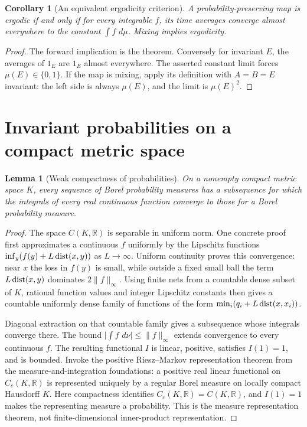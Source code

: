 \documentclass[11pt,oneside]{book}
\newtheorem{lemma}[theorem]{Lemma}
\newtheorem{corollary}[theorem]{Corollary}
\theoremstyle{definition}
\theoremstyle{remark}\newtheorem{remark}[theorem]{Remark}
\newcommand{\R}{\mathbb R}\newcommand{\C}{\mathbb C}
\newcommand{\dd}{\,d}\newcommand{\id}{\operatorname{id}}
\newcommand{\abs}[1]{\lvert#1\rvert}\newcommand{\norm}[1]{\lVert#1\rVert}
\begin{document}
\begin{corollary}[An equivalent ergodicity criterion]\label{d13:19:ergodic-criterion}
A probability-preserving map is ergodic if and only if for every
integrable \(f\), its time averages converge almost everywhere to
the constant \(\int f\,\dd\mu\). Mixing implies ergodicity.
\end{corollary}
\begin{proof}
The forward implication is the theorem. Conversely for invariant
\(E\), the averages of \(1_E\) are \(1_E\) almost everywhere.
The asserted constant limit forces \(\mu(E)\in\{0,1\}\).
If the map is mixing, apply its definition with \(A=B=E\) invariant:
the left side is always \(\mu(E)\), and the limit is \(\mu(E)^2\).
\end{proof}

\section{Invariant probabilities on a compact metric space}

\begin{lemma}[Weak compactness of probabilities]\label{d13:19:probability-compactness}
On a nonempty compact metric space \(K\), every sequence of Borel
probability measures has a subsequence for which the integrals of
every real continuous function converge to those for a Borel
probability measure.
\end{lemma}
\begin{proof}
The space \(C(K,\R)\) is separable in uniform norm. One concrete
proof first approximates a continuous \(f\) uniformly by the
Lipschitz functions
\(\inf_y(f(y)+L\operatorname{dist}(x,y))\) as \(L\to\infty\).
Uniform continuity proves this convergence: near \(x\) the loss
in \(f(y)\) is small, while outside a fixed small ball the term
\(L\operatorname{dist}(x,y)\) dominates \(2\norm{f}_\infty\).
Using finite nets from a countable dense subset of \(K\), rational
function values and integer Lipschitz constants then gives a
countable uniformly dense family of functions of the form
\(\min_i(q_i+L\operatorname{dist}(x,x_i))\).

Diagonal extraction on that countable family gives a subsequence
whose integrals converge there. The bound
\(\abs{\int f\,\dd\nu}\leq\norm{f}_\infty\) extends convergence to
every continuous \(f\). The resulting functional \(I\) is linear,
positive, satisfies \(I(1)=1\), and is bounded.
Invoke the positive Riesz--Markov representation theorem from the
measure-and-integration foundations: a positive real linear
functional on \(C_c(K,\R)\) is represented uniquely by a regular
Borel measure on locally compact Hausdorff \(K\).
Here compactness identifies \(C_c(K,\R)=C(K,\R)\), and \(I(1)=1\)
makes the representing measure a probability. This is the
measure representation theorem, not finite-dimensional inner-product
representation.
\end{proof}
\end{document}
